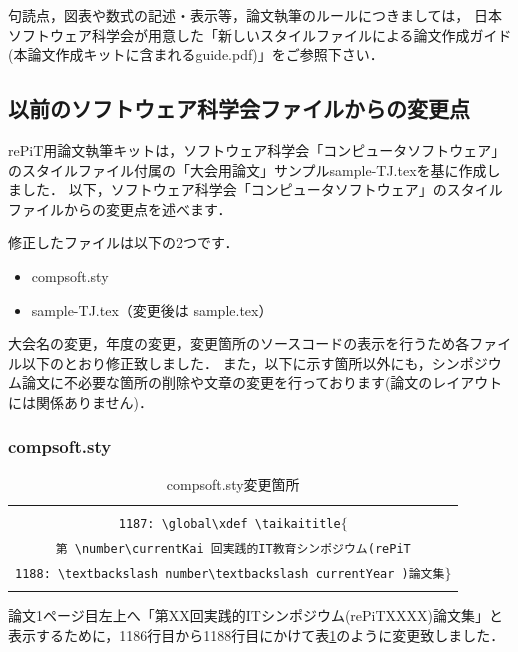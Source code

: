 \documentclass[T]{compsoft}
\begin{document}
句読点，図表や数式の記述・表示等，論文執筆のルールにつきましては，
日本ソフトウェア科学会が用意した「新しいスタイルファイルによる論文作成ガイド(本論文作成キットに含まれるguide.pdf)」をご参照下さい．

\subsection{以前のソフトウェア科学会ファイルからの変更点} \label{sec:differences}
rePiT用論文執筆キットは，ソフトウェア科学会「コンピュータソフトウェア」のスタイルファイル付属の「大会用論文」サンプルsample-TJ.texを基に作成しました．
以下，ソフトウェア科学会「コンピュータソフトウェア」のスタイルファイルからの変更点を述べます．

修正したファイルは以下の2つです．
\begin{itemize}
	\item compsoft.sty
	\item sample-TJ.tex（変更後は sample.tex）
\end{itemize}

大会名の変更，年度の変更，変更箇所のソースコードの表示を行うため各ファイル以下のとおり修正致しました．
また，以下に示す箇所以外にも，シンポジウム論文に不必要な箇所の削除や文章の変更を行っております(論文のレイアウトには関係ありません)．

\subsubsection*{compsoft.sty}
\begin{table}[t]
\caption{compsoft.sty変更箇所}
\label{table:change1}
 	\begin{tabular}{c}
		\begin{tabularx}{47zw}{X}
		\hline
		\verb|1186: \currentKai=\currentYear\advance\currentKai by - 2014 | ~\\
		\verb|1187: \global\xdef \taikaititle|$\{$ \\
		\hspace{130pt} \verb|第 \number\currentKai 回実践的IT教育シンポジウム(rePiT| \\
		\verb|1188: \textbackslash number\textbackslash currentYear )論文集|$\}$ 
		\\
		\hline
		\end{tabularx}
	\end{tabular}
\end{table}

論文1ページ目左上へ「第XX回実践的ITシンポジウム(rePiTXXXX)論文集」と表示するために，1186行目から1188行目にかけて表\ref{table:change1}のように変更致しました．
\end{document}
